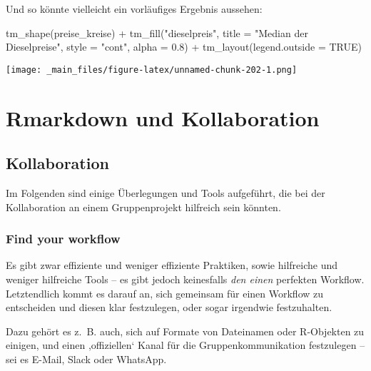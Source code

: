 \documentclass[
  ngerman,
]{article}
\newenvironment{Shaded}{\begin{snugshade}}{\end{snugshade}}
\newcommand{\AttributeTok}[1]{\textcolor[rgb]{0.77,0.63,0.00}{#1}}
\newcommand{\ConstantTok}[1]{\textcolor[rgb]{0.00,0.00,0.00}{#1}}
\newcommand{\FloatTok}[1]{\textcolor[rgb]{0.00,0.00,0.81}{#1}}
\newcommand{\FunctionTok}[1]{\textcolor[rgb]{0.00,0.00,0.00}{#1}}
\newcommand{\NormalTok}[1]{#1}
\newcommand{\SpecialCharTok}[1]{\textcolor[rgb]{0.00,0.00,0.00}{#1}}
\newcommand{\StringTok}[1]{\textcolor[rgb]{0.31,0.60,0.02}{#1}}
\begin{document}
Und so könnte vielleicht ein vorläufiges Ergebnis aussehen:

\begin{Shaded}
\begin{Highlighting}[]
\FunctionTok{tm\_shape}\NormalTok{(preise\_kreise) }\SpecialCharTok{+}
  \FunctionTok{tm\_fill}\NormalTok{(}\StringTok{"dieselpreis"}\NormalTok{,}
          \AttributeTok{title =} \StringTok{"Median der Dieselpreise"}\NormalTok{,}
          \AttributeTok{style =} \StringTok{"cont"}\NormalTok{,}
          \AttributeTok{alpha =} \FloatTok{0.8}\NormalTok{) }\SpecialCharTok{+}
  \FunctionTok{tm\_layout}\NormalTok{(}\AttributeTok{legend.outside =} \ConstantTok{TRUE}\NormalTok{)}
\end{Highlighting}
\end{Shaded}

\texttt{[image: \_main\_files/figure-latex/unnamed-chunk-202-1.png]}

\hypertarget{rmarkdown-und-kollaboration}{%
\section{Rmarkdown und Kollaboration}\label{rmarkdown-und-kollaboration}}

\hypertarget{kollaboration}{%
\subsection{Kollaboration}\label{kollaboration}}

Im Folgenden sind einige Überlegungen und Tools aufgeführt, die bei der Kollaboration an einem Gruppenprojekt hilfreich sein könnten.

\hypertarget{find-your-workflow}{%
\subsubsection{Find your workflow}\label{find-your-workflow}}

Es gibt zwar effiziente und weniger effiziente Praktiken, sowie hilfreiche und weniger hilfreiche Tools -- es gibt jedoch keinesfalls \emph{den einen} perfekten Workflow. Letztendlich kommt es darauf an, sich gemeinsam für einen Workflow zu entscheiden und diesen klar festzulegen, oder sogar irgendwie festzuhalten.

Dazu gehört es z.~B. auch, sich auf Formate von Dateinamen oder R-Objekten zu einigen, und einen ,offiziellen` Kanal für die Gruppenkommunikation festzulegen -- sei es E-Mail, Slack oder WhatsApp.
\end{document}
